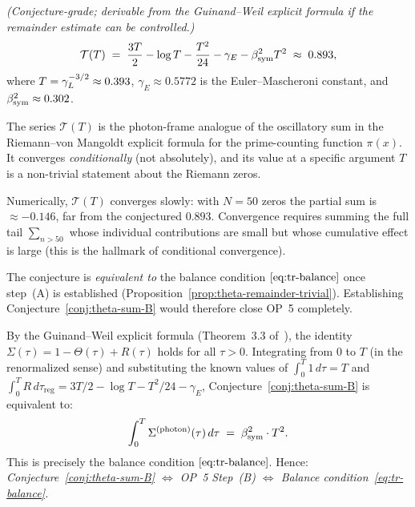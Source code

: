 \begin{proposition}
\label{conj:theta-sum-B}
\emph{(Conjecture-grade; derivable from the Guinand--Weil explicit
formula if the remainder estimate can be controlled.)}
\[
  \mathcal{T}(T)
  \;=\;
  \frac{3T}{2} - \log T - \frac{T^2}{24} - \gamma_E - \beta_{\mathrm{sym}}^2 T^2
  \;\approx\; 0.893,
\]
where $T = \gamma_L^{-3/2}\approx 0.393$, $\gamma_E\approx 0.5772$ is
the Euler--Mascheroni constant, and $\beta_{\mathrm{sym}}^2\approx 0.302$.
\end{proposition}

\begin{remark}
\label{rem:theta-sum-structure}
The series $\mathcal{T}(T)$ is the photon-frame analogue of the
oscillatory sum in the Riemann--von Mangoldt explicit formula for
the prime-counting function $\pi(x)$. It converges \emph{conditionally}
(not absolutely), and its value at a specific argument $T$ is a
non-trivial statement about the Riemann zeros.

Numerically, $\mathcal{T}(T)$ converges slowly: with $N=50$ zeros
the partial sum is $\approx -0.146$, far from the conjectured $0.893$.
Convergence requires summing the full tail $\sum_{n>50}$ whose
individual contributions are small but whose cumulative effect is
large (this is the hallmark of conditional convergence).

The conjecture is \emph{equivalent to} the balance condition
$\eqref{eq:tr-balance}$ once step~(A) is established
(Proposition~\ref{prop:theta-remainder-trivial}). Establishing
Conjecture~\ref{conj:theta-sum-B} would therefore close OP~5
completely.
\end{remark}

\begin{remark}
\label{rem:explicit-formula-remainder}
By the Guinand--Weil explicit formula
(Theorem~3.3 of~\cite{brendecke2026rh}), the identity
$\Sigma(\tau) = 1 - \Theta(\tau) + R(\tau)$ holds for all $\tau > 0$.
Integrating from $0$ to $T$ (in the renormalized sense) and
substituting the known values of $\int_0^T 1\,d\tau = T$ and
$\int_0^T R\,d\tau_{\mathrm{reg}} = 3T/2 - \log T - T^2/24 - \gamma_E$,
Conjecture~\ref{conj:theta-sum-B} is equivalent to:
\[
  \int_0^T \Sigma^{(\mathrm{photon})}(\tau)\,d\tau
  \;=\; \beta_{\mathrm{sym}}^2 \cdot T^2.
\]
This is precisely the balance condition $\eqref{eq:tr-balance}$.
Hence: \emph{Conjecture~\ref{conj:theta-sum-B} $\Leftrightarrow$
OP~5 Step~(B) $\Leftrightarrow$ Balance condition~\eqref{eq:tr-balance}.}
\end{remark}


